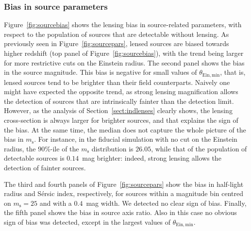 \documentclass{aa}
\def\msource{m_{\mathrm{s}}}
\def\Sref#1{Section~\ref{#1}\xspace}
\def\Fref#1{Figure~\ref{#1}\xspace}
\begin{document}
\subsubsection{Bias in source parameters}

\Fref{fig:sourcebias} shows the lensing bias in source-related parameters, with respect to the population of sources that are detectable without lensing.
As previously seen in \Fref{fig:sourcepars}, lensed sources are biased towards higher redshift (top panel of \Fref{fig:sourcebias}), with the trend being larger for more restrictive cuts on the Einstein radius.
The second panel shows the bias in the source magnitude. This bias is negative for small values of $\theta_{\mathrm{Ein,min}}$, that is, lensed sources tend to be brighter than their field counterparts.
Naively one might have expected the opposite trend, as strong lensing magnification allows the detection of sources that are intrinsically fainter than the detection limit.
However, as the analysis of \Sref{sect:indlenses} clearly shows, the lensing cross-section is always larger for brighter sources, and that explains the sign of the bias.
At the same time, the median does not capture the whole picture of the bias in $\msource$. For instance, in the fiducial simulation with no cut on the Einstein radius, the $90\%$-ile of the $\msource$ distribution is $26.05$, while that of the population of detectable sources is $0.14$~mag brighter: indeed, strong lensing allows the detection of fainter sources.

The third and fourth panels of \Fref{fig:sourcepars} show the bias in half-light radius and S\'{e}rsic index, respectively, for sources within a magnitude bin centred on $\msource=25$ and with a $0.4$~mag width.
We detected no clear sign of bias.
Finally, the fifth panel shows the bias in source axis ratio. Also in this case no obvious sign of bias was detected, except in the largest values of $\theta_{\mathrm{Ein,min}}$.
\end{document}

